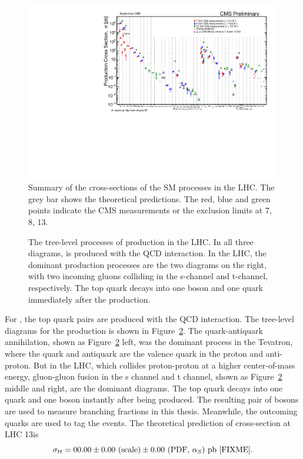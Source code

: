 \begin{figure}[ht]
    \centering
    \includegraphics[width=0.99\textwidth]{chapters/Physics/sectionPPCollision/figures/SigmaNew_v0.pdf}
    \caption{Summary of the cross-sections of the SM processes in the LHC. The grey bar shows the theoretical predictions. The red, blue and green points indicate the CMS measurements or the exclusion limits at 7, 8, 13\TeV.}
    \label{fig:physics:ppCollision:hardxs}
\end{figure}



\begin{figure}[ht]
    \centering
    
    \caption{The tree-level processes of \ttbar production in the LHC. In all three diagrams, \ttbar is produced with the QCD interaction. In the LHC, the dominant production processes are the two diagrams on the right, with two incoming gluons colliding in the s-channel and t-channel, respectively. The top quark decays into one \PW boson and one \PQb quark immediately after the production.}
    \label{fig:physics:ppCollision:tt}
\end{figure}
\noindent For \ttbar, the top quark pairs are produced with the QCD interaction. The tree-level diagrams for the \ttbar production is shown in Figure~\ref{fig:physics:ppCollision:tt}. The quark-antiquark annihilation, shown as Figure~\ref{fig:physics:ppCollision:tt} left, was the dominant process in the Tevatron, where the quark and antiquark are the valence quark in the proton and anti-proton. But in the LHC, which collides proton-proton at a higher center-of-mass energy, gluon-gluon fusion in the s channel and t channel, shown as  Figure~\ref{fig:physics:ppCollision:tt} middle and right, are the dominant diagrams. The top quark decays into one \PQb quark and one \PW boson instantly after being produced. The resulting pair of \PW bosons are used to measure \PW branching fractions in this thesis. Meanwhile, the outcoming \PQb quarks are used to tag the \ttbar events. The theoretical prediction of \ttbar cross-section at LHC 13\TeV is
\begin{equation}
    \sigma_{tt} = 00.00 \pm 0.00 \text{~(scale)} \pm 0.00 \text{~(PDF, \ensuremath{\alpha_S})~pb [FIXME]} .
\end{equation}



